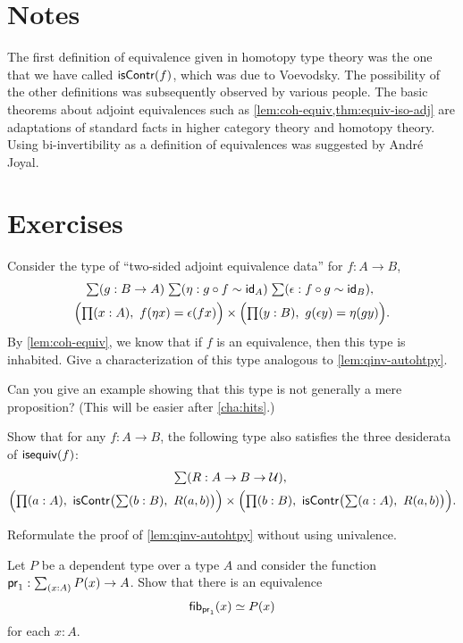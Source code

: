 
\section*{Notes}

The first definition of equivalence given in homotopy type theory was the one that we have called $\mathsf{isContr}(f)$, which was due to Voevodsky.
The possibility of the other definitions was subsequently observed by various people.
The basic theorems about adjoint equivalences such as \autoref{lem:coh-equiv,thm:equiv-iso-adj} are adaptations of standard facts in higher category theory and homotopy theory.
Using bi-invertibility as a definition of equivalences was suggested by Andr\'e Joyal.

\section*{Exercises}

\begin{ex}
  Consider the type of ``two-sided adjoint equivalence data'' for $f:A\to B$,
  \begin{multline*}
    \sm{g:B\to A}{\eta: g \circ f \sim \idfunc[A]}{\epsilon:f \circ g \sim \idfunc[B]}\\
    \Big(\prd{x:A} \map{f}{\eta x} = \epsilon(fx)\Big) \times
    \Big(\prd{y:B} \map{g}{\epsilon y} = \eta(gy) \Big).
  \end{multline*}
  By \autoref{lem:coh-equiv}, we know that if $f$ is an equivalence, then this type is inhabited.
  Give a characterization of this type analogous to \autoref{lem:qinv-autohtpy}.

  Can you give an example showing that this type is not generally a mere proposition?
  (This will be easier after \autoref{cha:hits}.)
\end{ex}

\begin{ex}
  Show that for any $f:A\to B$, the following type also satisfies the three desiderata of $\mathsf{isequiv}(f)$:
  \begin{multline*}
    \sm{R:A\to B\to \type}\\
    \Big(\prd{a:A} \iscontr\big(\sm{b:B} R(a,b)\big)\Big) \times
    \Big(\prd{b:B} \iscontr\big(\sm{a:A} R(a,b)\big)\Big).
  \end{multline*}
\end{ex}

\begin{ex}
  Reformulate the proof of \autoref{lem:qinv-autohtpy} without using univalence.
\end{ex}

\begin{ex}
Let $P$ be a dependent type over a type $A$ and consider the function
$\proj{1}:\sm{x:A}P(x)\to A$. Show that there is an equivalence
\begin{equation*}
\mathsf{fib}_{\mathsf{pr}_{1}}(x) \simeq P(x)
\end{equation*}
for each $x:A$.
\end{ex}

